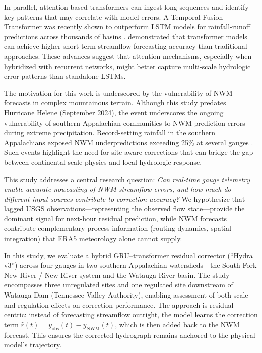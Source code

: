 \documentclass[draft]{agujournal2019}
\begin{document}
In parallel, attention-based transformers can ingest long sequences and identify key patterns that may correlate with model errors. A Temporal Fusion Transformer was recently shown to outperform LSTM models for rainfall-runoff predictions across thousands of basins \cite{rasiya2023}.  demonstrated that transformer models can achieve higher short-term streamflow forecasting accuracy than traditional approaches. These advances suggest that attention mechanisms, especially when hybridized with recurrent networks, might better capture multi-scale hydrologic error patterns than standalone LSTMs.

The motivation for this work is underscored by the vulnerability of NWM forecasts in complex mountainous terrain. Although this study predates Hurricane Helene (September 2024), the event underscores the ongoing vulnerability of southern Appalachian communities to NWM prediction errors during extreme precipitation. Record-setting rainfall in the southern Appalachians exposed NWM underpredictions exceeding 25\% at several gauges \cite{usgsHelene2024, nwsRFCHelene2024}. Such events highlight the need for site-aware corrections that can bridge the gap between continental-scale physics and local hydrologic response.

This study addresses a central research question: \textit{Can real-time gauge telemetry enable accurate nowcasting of NWM streamflow errors, and how much do different input sources contribute to correction accuracy?} We hypothesize that lagged USGS observations---representing the observed flow state---provide the dominant signal for next-hour residual prediction, while NWM forecasts contribute complementary process information (routing dynamics, spatial integration) that ERA5 meteorology alone cannot supply.

In this study, we evaluate a hybrid GRU--transformer residual corrector (``Hydra v3'') across four gauges in two southern Appalachian watersheds---the South Fork New River / New River system and the Watauga River basin. The study encompasses three unregulated sites and one regulated site downstream of Watauga Dam (Tennessee Valley Authority), enabling assessment of both scale and regulation effects on correction performance. The approach is residual-centric: instead of forecasting streamflow outright, the model learns the correction term $\hat{r}(t) = y_{\mathrm{obs}}(t) - y_{\mathrm{NWM}}(t)$, which is then added back to the NWM forecast. This ensures the corrected hydrograph remains anchored to the physical model's trajectory.
\end{document}

